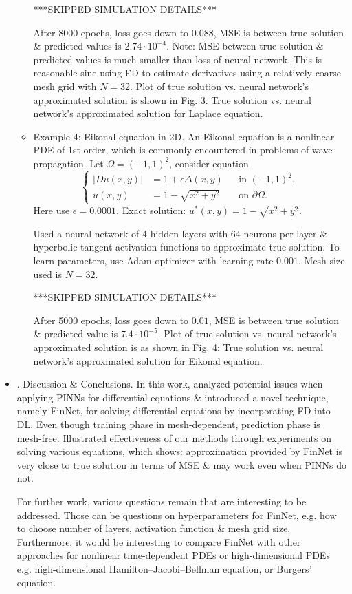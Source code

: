 \documentclass{article}
\begin{document}
\begin{itemize}
\begin{itemize}
		***SKIPPED SIMULATION DETAILS***
		
		After 8000 epochs, loss goes down to $0.088$, MSE is between true solution \& predicted values is $2.74\cdot10^{-4}$. Note: MSE between true solution \& predicted values is much smaller than loss of neural network. This is reasonable sine using FD to estimate derivatives using a relatively coarse mesh grid with $N = 32$. Plot of true solution vs. neural network's approximated solution is shown in {\sf Fig. 3. True solution vs. neural network's approximated solution for Laplace equation.}
		\item {\sf Example 4: Eikonal equation in 2D.} An Eikonal equation is a nonlinear PDE of 1st-order, which is commonly encountered in problems of wave propagation. Let $\Omega = (-1,1)^2$, consider equation
		\begin{equation*}
			\left\{\begin{split}
				|Du(x,y)| &= 1 + \epsilon\Delta(x,y)&&\mbox{in }(-1,1)^2,\\
				u(x,y) &= 1 - \sqrt{x^2 + y^2}&&\mbox{on }\partial\Omega.
			\end{split}\right.
		\end{equation*}
		Here use $\epsilon = 0.0001$. Exact solution: $u^*(x,y) = 1 - \sqrt{x^2 + y^2}$.
		
		Used a neural network of 4 hidden layers with 64 neurons per layer \& hyperbolic tangent activation functions to approximate true solution. To learn parameters, use Adam optimizer with learning rate $0.001$. Mesh size used is $N = 32$.
		
		***SKIPPED SIMULATION DETAILS***
		
		After 5000 epochs, loss goes down to $0.01$, MSE is between true solution \& predicted value is $7.4\cdot10^{-5}$. Plot of true solution vs. neural network's approximated solution is as shown in {\sf Fig. 4: True solution vs. neural network's approximated solution for Eikonal equation.}
	\end{itemize}	
	\item {. Discussion \& Conclusions.} In this work, analyzed potential issues when applying PINNs for differential equations \& introduced a novel technique, namely FinNet, for solving differential equations by incorporating FD into DL. Even though training phase in mesh-dependent, prediction phase is mesh-free. Illustrated effectiveness of our methods through experiments on solving various equations, which shows: approximation provided by FinNet is very close to true solution in terms of MSE \& may work even when PINNs do not.
	
	For further work, various questions remain that are interesting to be addressed. Those can be questions on hyperparameters for FinNet, e.g. how to choose number of layers, activation function \& mesh grid size. Furthermore, it would be interesting to compare FinNet with other approaches for nonlinear time-dependent PDEs or high-dimensional PDEs e.g. high-dimensional Hamilton--Jacobi--Bellman equation, or Burgers' equation.
\end{itemize}
\end{document}
